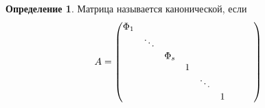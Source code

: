 \documentclass[a4paper, 12pt]{article}
\theoremstyle{definition}
\newtheorem*{definition}{Определение}
\begin{document}
    \begin{definition}
        Матрица называется канонической, если
        $$A = \begin{pmatrix}
            \Phi_1 & \null & \null & \null & \null & \null & \null & \null & \null\\
            \null & \ddots & \null  & \null & \null & \null & \null & \null & \null\\
            \null & \null & \Phi_s & \null & \null & \null & \null & \null & \null\\
            \null & \null & \null & 1 & \null & \null & \null & \null & \null\\
            \null & \null & \null & \null & \ddots & \null & \null & \null & \null\\
            \null & \null & \null & \null & \null & 1 & \null & \null & \null\\
        \end{pmatrix}$$ 
    \end{definition}
\end{document}
